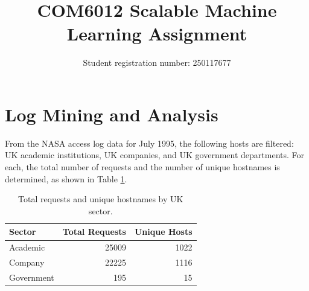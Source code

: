 \documentclass[12pt, a4paper]{article}
\title{\vspace{-1.5cm}\textbf{COM6012 Scalable Machine Learning Assignment}}
\author{Student registration number: 250117677}
\date{}
\makeatletter
\renewcommand{\maketitle}{
  \begin{center}
    {\LARGE \@title \par}
    \vspace{4pt}
    {\normalsize \@author \par}
  \end{center}
}
\makeatother
\begin{document}
\maketitle

\vspace{2pt}

\FloatBarrier
\section{Log Mining and Analysis}
From the NASA access log data for July 1995, the following hosts are filtered: UK academic institutions, UK companies, and UK government departments.
For each, the total number of requests and the number of unique hostnames is determined, as shown in Table \ref{tab:1}.
\begin{table}[htbp]
    \caption{Total requests and unique hostnames by UK sector.}
    \label{tab:1}
    \centering
    \begin{tabular}{lrr}
        Sector & Total Requests & Unique Hosts \\
        \midrule
        Academic & 25009 & 1022 \\
        Company & 22225 & 1116 \\
        Government & 195 & 15
    \end{tabular}
\end{table}
\end{document}
